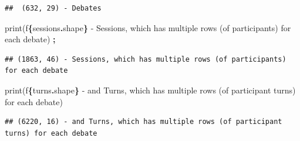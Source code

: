 \documentclass[
]{article}
\newenvironment{Shaded}{\begin{snugshade}}{\end{snugshade}}
\newcommand{\BuiltInTok}[1]{#1}
\newcommand{\NormalTok}[1]{#1}
\newcommand{\OperatorTok}[1]{\textcolor[rgb]{0.81,0.36,0.00}{\textbf{#1}}}
\newcommand{\SpecialCharTok}[1]{\textcolor[rgb]{0.81,0.36,0.00}{\textbf{#1}}}
\newcommand{\SpecialStringTok}[1]{\textcolor[rgb]{0.31,0.60,0.02}{#1}}
\begin{document}
\begin{verbatim}
##  (632, 29) - Debates
\end{verbatim}

\begin{Shaded}
\begin{Highlighting}[]
\BuiltInTok{print}\NormalTok{(}\SpecialStringTok{f\textquotesingle{}}\SpecialCharTok{\{}\NormalTok{sessions}\SpecialCharTok{.}\NormalTok{shape}\SpecialCharTok{\}}\SpecialStringTok{ {-} Sessions, which has multiple rows (of participants) for each debate\textquotesingle{}}\NormalTok{) }\OperatorTok{;}
\end{Highlighting}
\end{Shaded}

\begin{verbatim}
## (1863, 46) - Sessions, which has multiple rows (of participants) for each debate
\end{verbatim}

\begin{Shaded}
\begin{Highlighting}[]
\BuiltInTok{print}\NormalTok{(}\SpecialStringTok{f\textquotesingle{}}\SpecialCharTok{\{}\NormalTok{turns}\SpecialCharTok{.}\NormalTok{shape}\SpecialCharTok{\}}\SpecialStringTok{ {-} and Turns, which has multiple rows (of participant turns) for each debate\textquotesingle{}}\NormalTok{)}
\end{Highlighting}
\end{Shaded}

\begin{verbatim}
## (6220, 16) - and Turns, which has multiple rows (of participant turns) for each debate
\end{verbatim}
\end{document}
